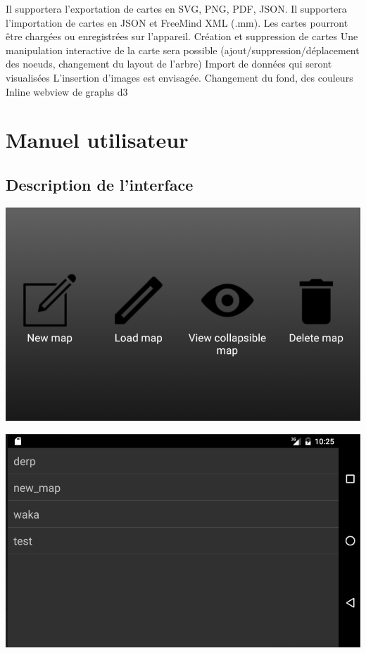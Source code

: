 \documentclass[11pt,a4paper,margin=0.5in]{report}
\begin{document}
Il supportera l'exportation de cartes en SVG, PNG, PDF, JSON.
Il supportera l'importation de cartes en JSON et FreeMind XML (.mm).
Les cartes pourront être chargées ou enregistrées sur l'appareil.
Création et suppression de cartes
Une manipulation interactive de la carte sera possible (ajout/suppression/déplacement des noeuds, changement du layout de l'arbre)
Import de données qui seront visualisées
L'insertion d'images est envisagée.
Changement du fond, des couleurs
Inline webview de graphs d3

\chapter{Manuel utilisateur}

\section{Description de l'interface}

\begin{center}
\includegraphics[scale=0.33]{dashb.png} \\[0.25in]
\end{center}

\begin{center}
\includegraphics[scale=0.33]{choice.png} \\[0.25in]
\end{center}
\end{document}
